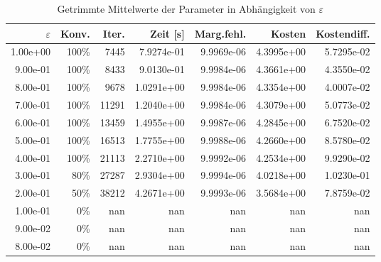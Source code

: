 \begin{table}[htbp]
\caption{Getrimmte Mittelwerte der Parameter in Abhängigkeit von $\varepsilon$}
\label{tab:Parametertest512_tol1e-05}
\small
\centering
{}
\begin{tabular}{rrrrrrr}
\toprule
$\varepsilon$ & Konv. & Iter. & Zeit [s] & Marg.fehl. & Kosten & Kostendiff. \\
\midrule
1.00e+00 & 100\% & 7445 & 7.9274e-01 & 9.9969e-06 & 4.3995e+00 & 5.7295e-02 \\
9.00e-01 & 100\% & 8433 & 9.0130e-01 & 9.9984e-06 & 4.3661e+00 & 4.3550e-02 \\
8.00e-01 & 100\% & 9678 & 1.0291e+00 & 9.9984e-06 & 4.3354e+00 & 4.0007e-02 \\
7.00e-01 & 100\% & 11291 & 1.2040e+00 & 9.9984e-06 & 4.3079e+00 & 5.0773e-02 \\
6.00e-01 & 100\% & 13459 & 1.4955e+00 & 9.9987e-06 & 4.2845e+00 & 6.7520e-02 \\
5.00e-01 & 100\% & 16513 & 1.7755e+00 & 9.9988e-06 & 4.2660e+00 & 8.5780e-02 \\
4.00e-01 & 100\% & 21113 & 2.2710e+00 & 9.9992e-06 & 4.2534e+00 & 9.9290e-02 \\
3.00e-01 & 80\% & 27287 & 2.9304e+00 & 9.9994e-06 & 4.0218e+00 & 1.0230e-01 \\
2.00e-01 & 50\% & 38212 & 4.2671e+00 & 9.9993e-06 & 3.5684e+00 & 7.8759e-02 \\
1.00e-01 & 0\% & nan & nan & nan & nan & nan \\
9.00e-02 & 0\% & nan & nan & nan & nan & nan \\
8.00e-02 & 0\% & nan & nan & nan & nan & nan \\
\bottomrule
\end{tabular}
\end{table}
